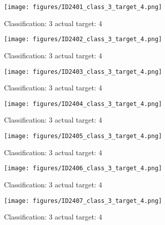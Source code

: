 \begin{figure}[h!]
\begin{center}
\texttt{[image: figures/ID2401\_class\_3\_target\_4.png]}
\end{center}
\caption{ Classification: 3 actual target: 4}
\label{fig:ID2401_class_3_target_4}
\end{figure}
\begin{figure}[h!]
\begin{center}
\texttt{[image: figures/ID2402\_class\_3\_target\_4.png]}
\end{center}
\caption{ Classification: 3 actual target: 4}
\label{fig:ID2402_class_3_target_4}
\end{figure}
\begin{figure}[h!]
\begin{center}
\texttt{[image: figures/ID2403\_class\_3\_target\_4.png]}
\end{center}
\caption{ Classification: 3 actual target: 4}
\label{fig:ID2403_class_3_target_4}
\end{figure}
\begin{figure}[h!]
\begin{center}
\texttt{[image: figures/ID2404\_class\_3\_target\_4.png]}
\end{center}
\caption{ Classification: 3 actual target: 4}
\label{fig:ID2404_class_3_target_4}
\end{figure}
\begin{figure}[h!]
\begin{center}
\texttt{[image: figures/ID2405\_class\_3\_target\_4.png]}
\end{center}
\caption{ Classification: 3 actual target: 4}
\label{fig:ID2405_class_3_target_4}
\end{figure}
\begin{figure}[h!]
\begin{center}
\texttt{[image: figures/ID2406\_class\_3\_target\_4.png]}
\end{center}
\caption{ Classification: 3 actual target: 4}
\label{fig:ID2406_class_3_target_4}
\end{figure}
\begin{figure}[h!]
\begin{center}
\texttt{[image: figures/ID2407\_class\_3\_target\_4.png]}
\end{center}
\caption{ Classification: 3 actual target: 4}
\label{fig:ID2407_class_3_target_4}
\end{figure}
